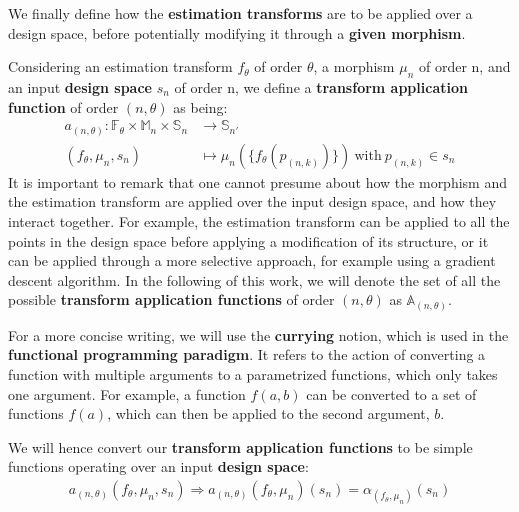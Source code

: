             We finally define how the {\bf estimation transforms} are to be applied over a design space, before potentially modifying it through a {\bf given morphism}.
            
            Considering an estimation transform $f_\theta$ of order $\theta$, a morphism $\mu_n$ of order n, and an input {\bf design space} $s_n$ of order n, we define a {\bf transform application function} of order $(n, \theta)$ as being:
            \begin{equation}
                \label{ch.dse:sec.functional:ssec.formalization:eq.application}
                \begin{split}
                    a_{(n, \theta)}: \mathbb{F}_\theta \times \mathbb{M}_n \times \mathbb{S}_n & \rightarrow \mathbb{S}_{n'}\\
                    (f_\theta, \mu_n, s_n) & \mapsto \mu_n(\{f_\theta(p_{(n, k)})\}) \: \text{with} \: p_{(n,k)} \in s_n  
                \end{split}
            \end{equation}
            It is important to remark that one cannot presume about how the morphism and the estimation transform are applied over the input design space, and how they interact together.
            For example, the estimation transform can be applied to all the points in the design space before applying a modification of its structure, or it can be applied through a more selective approach, for example using a gradient descent algorithm.
            In the following of this work, we will denote the set of all the possible {\bf transform application functions} of order $(n, \theta)$ as $\mathbb{A}_{(n, \theta)}$.

            For a more concise writing, we will use the {\bf currying} notion, which is used in the {\bf functional programming paradigm}.
            It refers to the action of converting a function with multiple arguments to a parametrized functions, which only takes one argument.
            For example, a function $f(a, b)$ can be converted to a set of functions $f(a)$, which can then be applied to the second argument, $b$.

            We will hence convert our {\bf transform application functions} to be simple functions operating over an input {\bf design space}:
            \begin{equation}
                \begin{split}
                \label{ch.dse:sec.functional:ssec.formalization:eq.app}
                    a_{(n, \theta)}(f_\theta, \mu_n, s_n) \Rightarrow a_{(n, \theta)}(f_\theta, \mu_n)(s_n) = \alpha_{(f_\theta, \mu_n)}(s_n)
                \end{split}
            \end{equation}

